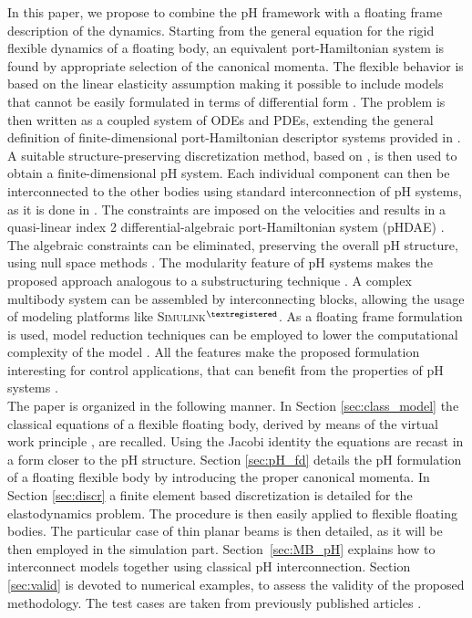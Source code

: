 \documentclass{svjour3}                     %
\begin{document}
\indent In this paper, we propose to combine the pH framework with a floating frame description of the dynamics. Starting from the general equation for the rigid flexible dynamics of a floating body, an equivalent port-Hamiltonian system is found by appropriate selection of the canonical momenta. The flexible behavior is based on the linear elasticity assumption making it possible to include models that cannot be easily formulated in terms of differential form  \cite{BRUGNOLI2019940,BRUGNOLI2019961}. The problem is then written as a coupled system of ODEs and PDEs, extending the general definition of finite-dimensional port-Hamiltonian descriptor systems provided in \cite{mehrmann2019structurepreserving}. A suitable structure-preserving discretization method, based on \cite{cardoso2019partitioned}, is then used to obtain a finite-dimensional pH system. Each individual component can then be interconnected to the other bodies using standard interconnection of pH systems, as it is done in \cite{macchelli_flrig}. The constraints are imposed on the velocities and results in a quasi-linear index 2 differential-algebraic port-Hamiltonian system (pHDAE) \cite{phd_steinbrecher,beattie2018linear}. The algebraic constraints can be eliminated, preserving the overall pH structure, using null space methods \cite{nullspaceFlMult}. The modularity feature of pH systems makes the proposed approach analogous to a substructuring technique \cite{substructuring}. A complex multibody system can be assembled by interconnecting blocks, allowing the usage of modeling platforms like \textsc{Simulink}$^{\tiny{\textregistered}}$. As a floating frame formulation is used, model reduction techniques can be employed to lower the computational complexity of the model \cite{phode_red,phdae_red}. All the features make the proposed formulation interesting for control applications, that can benefit from the properties of pH systems \cite{ORTEGAsurvey,PHadaptive}. \\
\indent The paper is organized in the following manner. In Section \ref{sec:class_model} the classical equations of a flexible floating body, derived by means of the virtual work principle \cite{MB_Daepde,simeon2013computational}, are recalled. Using the Jacobi identity the equations are recast in a form closer to the pH structure. Section \ref{sec:pH_fd} details the pH formulation of a floating flexible body by introducing the proper canonical momenta. In Section \ref{sec:discr} a finite element based discretization is detailed for the elastodynamics problem. The procedure is then easily applied to flexible floating bodies. The particular case of thin planar beams is then detailed, as it will be then employed in the simulation part. Section~\ref{sec:MB_pH} explains how to interconnect models together using classical pH interconnection. Section \ref{sec:valid} is devoted to numerical examples, to assess the validity of the proposed methodology. The test cases are taken from previously published articles \cite{Chebbi2017,Ellenbroek2018}.
\end{document}
